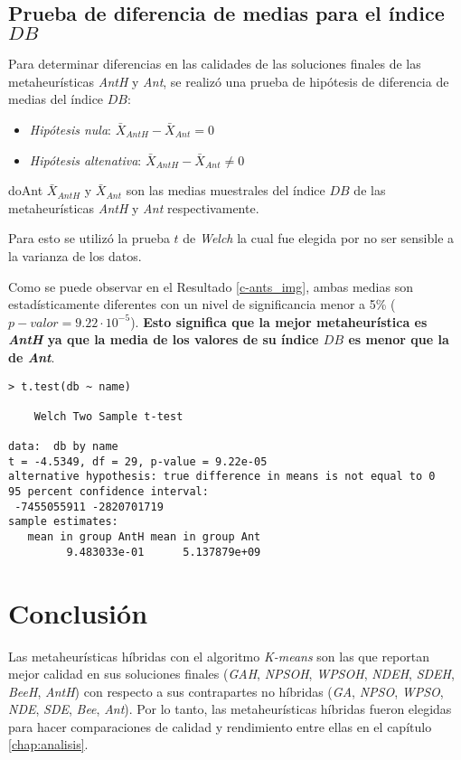 \subsection{Prueba de diferencia de medias para el índice $DB$}

    Para determinar diferencias en las calidades de las soluciones finales de las
metaheurísticas \emph{AntH} y \emph{Ant}, se realizó una prueba de hipótesis de
diferencia de medias del índice $DB$:
\begin{itemize}
    \item \emph{Hipótesis nula}: $\bar{X}_{AntH} - \bar{X}_{Ant} = 0$
    \item \emph{Hipótesis altenativa}: $\bar{X}_{AntH} - \bar{X}_{Ant} \neq 0$
\end{itemize}
doAnt $\bar{X}_{AntH}$ y $\bar{X}_{Ant}$ son las medias muestrales del índice
$DB$ de las metaheurísticas \emph{AntH} y \emph{Ant} respectivamente.

    Para esto se utilizó la prueba $t$ de \emph{Welch} \cite{AB_0} la cual fue
elegida por no ser sensible a la varianza de los datos.

	Como se puede observar en el Resultado \ref{c-ants_img}, ambas medias son
estadísticamente diferentes con un nivel de significancia menor a 5\%
($p-valor = 9.22 \cdot 10^{-5}$). { \bf Esto significa que la mejor metaheurística
es \emph{AntH} ya que la media de los valores de su índice $DB$ es menor que la
de \emph{Ant}}.

\begin{lstlisting}[float=h!, caption={Diferencia de Medias: Índice \emph{DB}}, label=c-ants_img]
> t.test(db ~ name)

	Welch Two Sample t-test

data:  db by name 
t = -4.5349, df = 29, p-value = 9.22e-05
alternative hypothesis: true difference in means is not equal to 0 
95 percent confidence interval:
 -7455055911 -2820701719 
sample estimates:
   mean in group AntH mean in group Ant
         9.483033e-01      5.137879e+09 

\end{lstlisting}

\section{Conclusión}

	Las metaheurísticas híbridas con el algoritmo \emph{K-means} son las que
reportan mejor calidad en sus soluciones finales (\emph{GAH}, \emph{NPSOH},
\emph{WPSOH}, \emph{NDEH}, \emph{SDEH}, \emph{BeeH}, \emph{AntH}) con respecto a
sus contrapartes no híbridas (\emph{GA}, \emph{NPSO}, \emph{WPSO}, \emph{NDE},
\emph{SDE}, \emph{Bee}, \emph{Ant}). Por lo tanto, las metaheurísticas híbridas
fueron elegidas para hacer comparaciones de calidad y rendimiento entre ellas en
el capítulo \ref{chap:analisis}.
